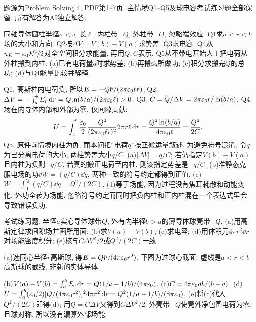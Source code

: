 题源为\href{https://ocw.mit.edu/courses/8-02-physics-ii-electricity-and-magnetism-spring-2007/resources/solving04/}{Problem Solving 4}, PDF第1--7页. 主情境Q1--Q5及球电容考试练习题全部保留. 所有解答为AI独立解答.

\begin{exercise}
同轴导体圆柱半径$a<b$, 长$\ell$, 内柱带$-Q$, 外柱带$+Q$, 忽略端效应.
Q1求$a<r<b$场的大小和方向.
Q2按$\Delta V=V(b)-V(a)$求势差.
Q3求电容.
Q4从$u_E=\varepsilon_0 E^2/2$对全空间积分求能量, 再用$Q,C$表示.
Q5从不带电开始人工把电荷从外柱搬到内柱: (a)已有电荷量$q$时求势差; (b)再搬$\dd q$所做功; (c)积分求搬完$Q$的总功; (d)与Q4能量比较并解释.
\end{exercise}
\begin{solution}
Q1. 高斯柱内电荷负, 所以$\boldsymbol{E}=-Q\hat{\boldsymbol{r}}/(2\pi\varepsilon_0\ell r)$.
Q2. $\Delta V=-\int_a^b E_r\,\mathrm d r=Q\ln(b/a)/(2\pi\varepsilon_0\ell)>0$.
Q3. $C=Q/\Delta V=2\pi\varepsilon_0\ell/\ln(b/a)$.
Q4. 场在内导体内部和外部为零, 仅间隙贡献:
\[
U=\int_a^b\frac{\varepsilon_0}2\frac{Q^2}{(2\pi\varepsilon_0\ell r)^2}2\pi r\ell\,\mathrm d r
=\frac{Q^2\ln(b/a)}{4\pi\varepsilon_0\ell}=\frac{Q^2}{2C}.
\]
Q5. 原件前情境内柱为负, 而本问把“电荷$q$”按正搬运量叙述. 为避免符号混淆, 令$q$为已分离电荷的大小, 两柱势差大小$q/C$. (a)$|\Delta V|=q/C$; 若仍指定$V(b)-V(a)$且内柱为负则$+q/C$. 若真的搬正电荷至内柱, 则该指定势差是$-q/C$. (b)准静态克服电场的功$\dd W=(q/C)\dd q$, 两种一致的符号约定都得到正值. (c)$W=\int_0^Q(q/C)\dd q=Q^2/(2C)$. (d)等于场能, 因为过程没有焦耳耗散和动能变化, 外功全转为场能. 忽略符号约定而同时把负内柱和正内柱混在一个表达式里会导致错误负功.
\end{solution}

\begin{exercise}
考试练习题. 半径$a$实心导体球带$Q$, 外有内半径$b>a$的薄导体球壳带$-Q$. (a)用高斯定律求间隙场并画所用面; (b)求$V(a)-V(b)$; (c)求电容; (d)用体积元$4\pi r^2\dd r$对场能密度积分; (e)核与$C\Delta V^2/2$或$Q^2/(2C)$一致.
\end{exercise}
\begin{solution}
(a)选同心半径$r$高斯球, 得$\boldsymbol{E}=Q\hat{\boldsymbol{r}}/(4\pi\varepsilon_0 r^2)$. 下图为过球心截面, 虚线是$a<r<b$高斯球的截线, 非新的实体导体.
\begin{center}\end{center}
(b)$V(a)-V(b)=\int_a^bE_r\,\mathrm d r=Q(1/a-1/b)/(4\pi\varepsilon_0)$.
(c)$C=4\pi\varepsilon_0 ab/(b-a)$.
(d)$U=\int_a^b(\varepsilon_0/2)[Q/(4\pi\varepsilon_0 r^2)]^2 4\pi r^2\,\mathrm d r=Q^2(1/a-1/b)/(8\pi\varepsilon_0)$.
(e)将(c)代入$Q^2/(2C)$即得(d); 用$Q=C\Delta V$又得到$C\Delta V^2/2$. 外壳带$-Q$使壳外净包围电荷为零, 且球对称, 所以没有漏算外部场能.
\end{solution}

